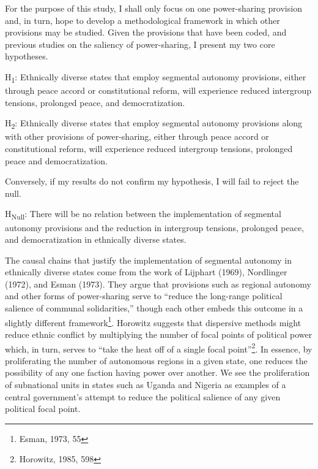 \documentclass[12pt]{article}
\begin{document}
For the purpose of this study, I shall only focus on one power-sharing provision and, in turn, hope to develop a methodological framework in which other provisions may be studied. Given the provisions that have been coded, and previous studies on the saliency of power-sharing, I present my two core hypotheses.

\singlespacing
H\textsubscript{1}: Ethnically diverse states that employ segmental autonomy provisions, either through peace accord or constitutional reform, will experience reduced intergroup tensions, prolonged peace, and democratization.

\bigskip

H\textsubscript{2}: Ethnically diverse states that employ segmental autonomy provisions along with other provisions of power-sharing, either through peace accord or constitutional reform, will experience reduced intergroup tensions, prolonged peace and democratization. 

\doublespacing
Conversely, if my results do not confirm my hypothesis, I will fail to reject the null. 

\singlespacing
H\textsubscript{Null}: There will be no relation between the implementation of segmental autonomy provisions and the reduction in intergroup tensions, prolonged peace, and democratization in ethnically diverse states. 

\doublespacing
The causal chains that justify the implementation of segmental autonomy in ethnically diverse states come from the work of Lijphart (1969), Nordlinger (1972), and Esman (1973). They argue that provisions such as regional autonomy and other forms of power-sharing serve to “reduce the long-range political salience of communal solidarities,” though each other embeds this outcome in a slightly different framework\footnote{Esman, 1973, 55}. Horowitz suggests that dispersive methods might reduce ethnic conflict by multiplying the number of focal points of political power which, in turn, serves to “take the heat off of a single focal point”\footnote{Horowitz, 1985, 598}. In essence, by proliferating the number of autonomous regions in a given state, one reduces the possibility of any one faction having power over another. We see the proliferation of subnational units in states such as Uganda and Nigeria as examples of a central government’s attempt to reduce the political salience of any given political focal point. 
\end{document}
